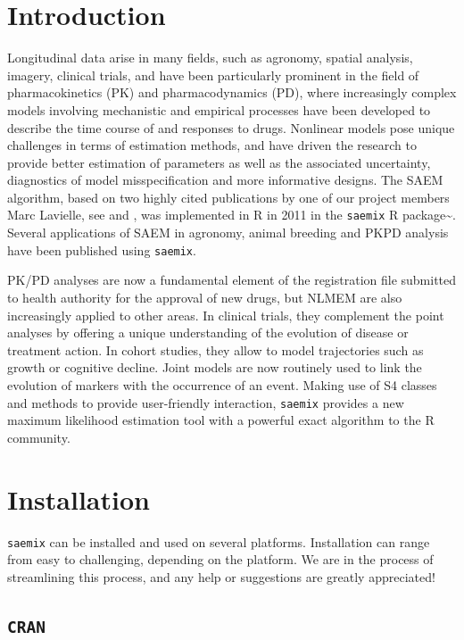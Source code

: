 \documentclass[]{book}
\begin{document}
\chapter{Introduction}\label{intro}

Longitudinal data arise in many fields, such as agronomy, spatial
analysis, imagery, clinical trials, and have been particularly prominent
in the field of pharmacokinetics (PK) and pharmacodynamics (PD), where
increasingly complex models involving mechanistic and empirical
processes have been developed to describe the time course of and
responses to drugs. Nonlinear models pose unique challenges in terms of
estimation methods, and have driven the research to provide better
estimation of parameters as well as the associated uncertainty,
diagnostics of model misspecification and more informative designs. The
SAEM algorithm, based on two highly cited publications by one of our
project members Marc Lavielle, see \citep{lavielle} and \citep{kuhn},
was implemented in R in 2011 in the \texttt{saemix} R
package\textasciitilde{}\citep{saemix2017}. Several applications of SAEM
in agronomy, animal breeding and PKPD analysis have been published using
\texttt{saemix}.

PK/PD analyses are now a fundamental element of the registration file
submitted to health authority for the approval of new drugs, but NLMEM
are also increasingly applied to other areas. In clinical trials, they
complement the point analyses by offering a unique understanding of the
evolution of disease or treatment action. In cohort studies, they allow
to model trajectories such as growth or cognitive decline. Joint models
are now routinely used to link the evolution of markers with the
occurrence of an event. Making use of S4 classes and methods to provide
user-friendly interaction, \texttt{saemix} provides a new maximum
likelihood estimation tool with a powerful exact algorithm to the R
community.

\chapter{Installation}\label{install}

\texttt{saemix} can be installed and used on several platforms.
Installation can range from easy to challenging, depending on the
platform. We are in the process of streamlining this process, and any
help or suggestions are greatly appreciated!

\section{\texorpdfstring{\texttt{CRAN}}{CRAN}}\label{cran}
\end{document}

